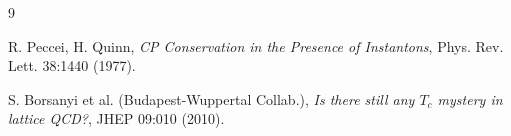 \documentclass[12pt,a4paper]{article}
\theoremstyle{definition}
\theoremstyle{remark}
\begin{document}
\begin{thebibliography}{9}

 R. Peccei, H. Quinn, \emph{CP Conservation in the Presence of 
Instantons}, Phys. Rev. Lett. 38:1440 (1977).

 S. Borsanyi et al. (Budapest-Wuppertal Collab.), 
\emph{Is there still any $T_c$ mystery in lattice QCD?}, JHEP 09:010 (2010).
\end{thebibliography}
\end{document}
